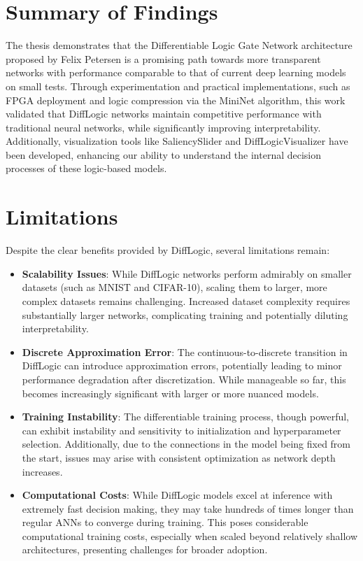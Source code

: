 
\section{Summary of Findings}
\label{sec:summary_findings}

The thesis demonstrates that the Differentiable Logic Gate Network architecture proposed by Felix Petersen is a promising path towards more transparent networks with performance comparable to that of current deep learning models on small tests. Through experimentation and practical implementations, such as FPGA deployment and logic compression via the MiniNet algorithm, this work validated that DiffLogic networks maintain competitive performance with traditional neural networks, while significantly improving interpretability. Additionally, visualization tools like SaliencySlider and DiffLogicVisualizer have been developed, enhancing our ability to understand the internal decision processes of these logic-based models.

\section{Limitations}
\label{sec:limitations}

Despite the clear benefits provided by DiffLogic, several limitations remain:

\begin{itemize}[noitemsep,topsep=0pt]
\item \textbf{Scalability Issues}: While DiffLogic networks perform admirably on smaller datasets (such as MNIST and CIFAR-10), scaling them to larger, more complex datasets remains challenging. Increased dataset complexity requires substantially larger networks, complicating training and potentially diluting interpretability.

\item \textbf{Discrete Approximation Error}: The continuous-to-discrete transition in DiffLogic can introduce approximation errors, potentially leading to minor performance degradation after discretization. While manageable so far, this becomes increasingly significant with larger or more nuanced models.

\item \textbf{Training Instability}: The differentiable training process, though powerful, can exhibit instability and sensitivity to initialization and hyperparameter selection. Additionally, due to the connections in the model being fixed from the start, issues may arise with consistent optimization as network depth increases.

\item \textbf{Computational Costs}: While DiffLogic models excel at inference with extremely fast decision making, they may take hundreds of times longer than regular ANNs to converge during training. This poses considerable computational training costs, especially when scaled beyond relatively shallow architectures, presenting challenges for broader adoption.
\end{itemize}


